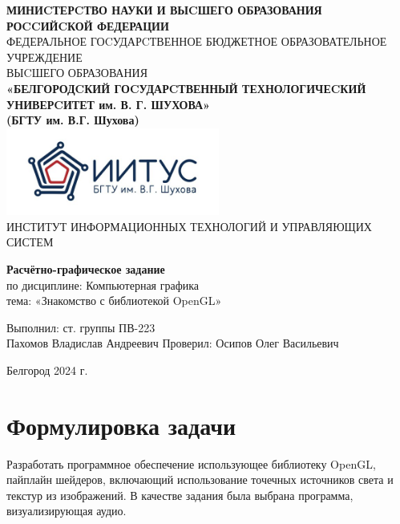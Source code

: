 \documentclass[a4paper,14pt]{extarticle}
\newcommand\textbox[1]{
	\parbox{.45\textwidth}{#1}
}
\begin{document}
\begin{center}
    \small{
        \textbf{МИНИCТЕРCТВО НАУКИ И ВЫCШЕГО ОБРАЗОВАНИЯ РОCCИЙCКОЙ ФЕДЕРАЦИИ}\\
        ФЕДЕРАЛЬНОЕ ГОCУДАРCТВЕННОЕ БЮДЖЕТНОЕ ОБРАЗОВАТЕЛЬНОЕ УЧРЕЖДЕНИЕ\\ВЫCШЕГО ОБРАЗОВАНИЯ \\
        \textbf{«БЕЛГОРОДCКИЙ ГОCУДАРCТВЕННЫЙ ТЕХНОЛОГИЧЕCКИЙ\\УНИВЕРCИТЕТ им. В. Г. ШУХОВА»\\ (БГТУ им. В.Г. Шухова)} \\
        \bigbreak
        \includegraphics[width=70mm]{log}\\
        ИНСТИТУТ ИНФОРМАЦИОННЫХ ТЕХНОЛОГИЙ И УПРАВЛЯЮЩИХ СИСТЕМ\\}
\end{center}

\vfill
\begin{center}
    \large{
        \textbf{
            Расчётно-графическое задание}}\\
    \normalsize{
        по дисциплине: Компьютерная графика \\
        тема: «Знакомство с библиотекой OpenGL»}
\end{center}
\vfill
\hfill\textbox{
    Выполнил: ст. группы ПВ-223\\Пахомов Владислав Андреевич
    \bigbreak
    Проверил: Осипов Олег Васильевич
}
\vfill\begin{center}
    Белгород 2024 г.
\end{center}
\newpage

\renewcommand{\contentsname}{Оглавление}
\tableofcontents\newpage

\section{Формулировка задачи}
Разработать программное обеспечение использующее библиотеку OpenGL, пайплайн шейдеров, 
включающий использование точечных источников света и текстур из изображений. \bigbreak
В качестве задания была выбрана программа, визуализирующая аудио.
\end{document}
